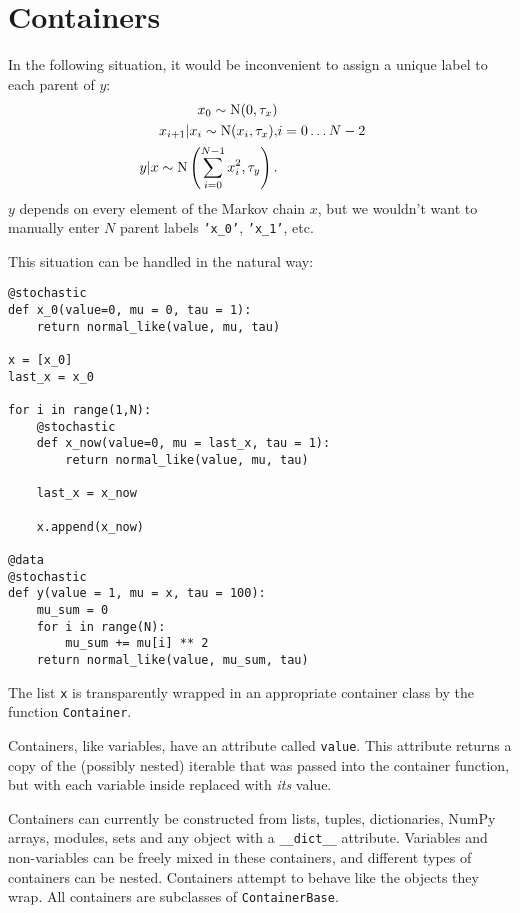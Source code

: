 \hypertarget{container}{}
\section*{Containers} \label{container}

In the following situation, it would be inconvenient to assign a unique label to each parent of $y$:
\begin{eqnarray*}
    x_0 \sim \textup N(0,\tau_x)\\
    x_{i+1}|x_i\sim\textup{N}(x_i, \tau_x),& i=0\ldots N-2\\
    y|x \sim \textup N\left(\sum_{i=0}^{N-1}x_i^2,\tau_y\right).
\end{eqnarray*}
$y$ depends on every element of the Markov chain $x$, but we wouldn't want to manually enter $N$ parent labels \texttt{'x_0'}, \texttt{'x_1'}, etc.

This situation can be handled in the natural way:
\begin{verbatim}
@stochastic
def x_0(value=0, mu = 0, tau = 1):
    return normal_like(value, mu, tau)

x = [x_0]
last_x = x_0

for i in range(1,N):          
    @stochastic
    def x_now(value=0, mu = last_x, tau = 1):
        return normal_like(value, mu, tau)
        
    last_x = x_now
    
    x.append(x_now)

@data
@stochastic
def y(value = 1, mu = x, tau = 100):
    mu_sum = 0
    for i in range(N):
        mu_sum += mu[i] ** 2
    return normal_like(value, mu_sum, tau)
\end{verbatim}
The list \texttt{x} is transparently wrapped in an appropriate container class by the function \texttt{Container}.

Containers, like variables, have an attribute called \texttt{value}. This attribute returns a copy of the (possibly nested) iterable that was passed into the container function, but with each variable inside replaced with \emph{its} value. 

Containers can currently be constructed from lists, tuples, dictionaries, NumPy arrays, modules, sets and any object with a \texttt{__dict__} attribute. Variables and non-variables can be freely mixed in these containers, and different types of containers can be nested. Containers attempt to behave like the objects they wrap. All containers are subclasses of \texttt{ContainerBase}. 

